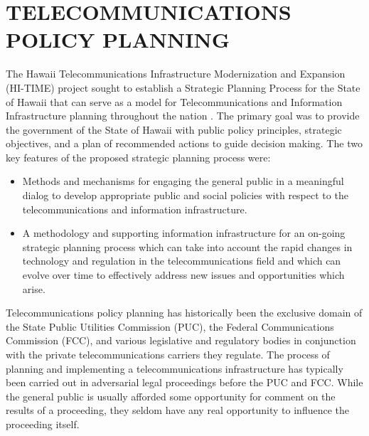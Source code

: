 
\section{TELECOMMUNICATIONS POLICY PLANNING}

The Hawaii Telecommunications Infrastructure Modernization and Expansion
(HI-TIME) project sought to establish a Strategic Planning Process for the
State of Hawaii that can serve as a model for Telecommunications and
Information Infrastructure planning throughout the nation \cite{TIIAP95}.
The primary goal was to provide the government of the State of Hawaii with
public policy principles, strategic objectives, and a plan of recommended
actions to guide decision making.  The two key features of the proposed
strategic planning process were:

\begin{itemize} 

\item Methods and mechanisms for engaging the general public in a
  meaningful dialog to develop appropriate public and social policies with
  respect to the telecommunications and information infrastructure.

\item A methodology and supporting information infrastructure for an
  on-going strategic planning process which can take into account the rapid
  changes in technology and regulation in the telecommunications field and
  which can evolve over time to effectively address new issues and
  opportunities which arise.

\end{itemize} 
 
Telecommunications policy planning has historically been the exclusive
domain of the State Public Utilities Commission (PUC), the Federal
Communications Commission (FCC), and various legislative and regulatory
bodies in conjunction with the private telecommunications carriers they
regulate.  The process of planning and implementing a telecommunications
infrastructure has typically been carried out in adversarial legal
proceedings before the PUC and FCC.  While the general public is usually
afforded some opportunity for comment on the results of a proceeding, they
seldom have any real opportunity to influence the proceeding itself.
 
